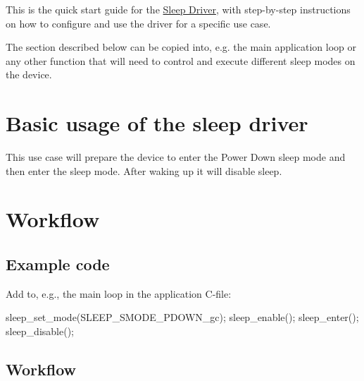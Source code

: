This is the quick start guide for the \hyperlink{group__sleep__group}{Sleep Driver}, with step-\/by-\/step instructions on how to configure and use the driver for a specific use case.

The section described below can be copied into, e.\-g. the main application loop or any other function that will need to control and execute different sleep modes on the device.\hypertarget{xmega_sleep_quickstart_xmega_sleep_quickstart_basic}{}\section{Basic usage of the sleep driver}\label{xmega_sleep_quickstart_xmega_sleep_quickstart_basic}
This use case will prepare the device to enter the Power Down sleep mode and then enter the sleep mode. After waking up it will disable sleep.\hypertarget{xmega_sleep_quickstart_xmega_sleep_basic_usage}{}\section{Workflow}\label{xmega_sleep_quickstart_xmega_sleep_basic_usage}
\hypertarget{xmega_sleep_quickstart_xmega_sleep_basic_usage_code}{}\subsection{Example code}\label{xmega_sleep_quickstart_xmega_sleep_basic_usage_code}
Add to, e.\-g., the main loop in the application C-\/file\-: 
\begin{DoxyCode}
        sleep\_set\_mode(SLEEP\_SMODE\_PDOWN\_gc);
        sleep\_enable();
        sleep\_enter();
        sleep\_disable();
\end{DoxyCode}
\hypertarget{xmega_sleep_quickstart_xmega_sleep_basic_usage}{}\subsection{Workflow}\label{xmega_sleep_quickstart_xmega_sleep_basic_usage}

